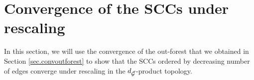 \section{Convergence of the SCCs under rescaling}\label{sec.convSCCs}

In this section, we will use the convergence of the out-forest that we obtained in Section \ref{sec.convoutforest} to show that the SCCs ordered by decreasing number of edges converge under rescaling in the $d_{\vec{{\mathcal G}}}$-product topology. 


